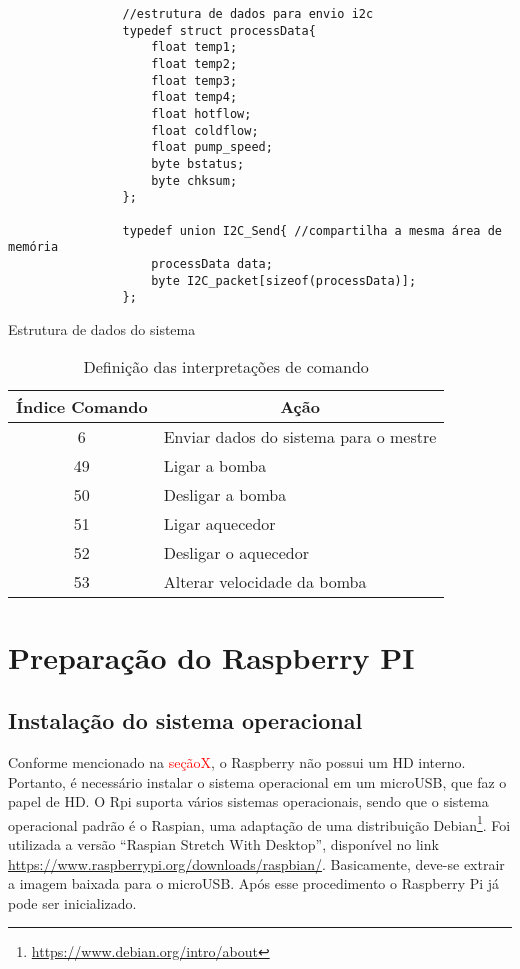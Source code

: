 			\begin{listing}
				\begin{verbatim}
				//estrutura de dados para envio i2c
				typedef struct processData{
					float temp1;
					float temp2;
					float temp3;
					float temp4;
					float hotflow;
					float coldflow;
					float pump_speed;
					byte bstatus;
					byte chksum;
				};
				
				typedef union I2C_Send{ //compartilha a mesma área de memória
					processData data;
					byte I2C_packet[sizeof(processData)];
				};				
				\end{verbatim}
				\caption{Estrutura de dados do sistema}
				\label{cod:dadosi2c}
			\end{listing}
		
		\begin{table}[!htb]
			\centering
			\caption{Definição das interpretações de comando}
			\label{tbl5}
			\def\arraystretch{1.3}
			\begin{tabular}{c p{11cm}}
				\hline
				\multicolumn{1}{c}{\textbf{Índice Comando}} & \multicolumn{1}{c}{\textbf{Ação}} \\ \hline
				
				6 & Enviar dados do sistema para o mestre \\
				49 & Ligar a bomba \\ %
				50 & Desligar a bomba \\ %
				51 & Ligar aquecedor \\ %
				52 & Desligar o aquecedor \\ %
				53 & Alterar velocidade da bomba \\ %
				\hline
			\end{tabular}
		\end{table}
		
	\section{Preparação do Raspberry PI}
		\subsection{Instalação do sistema operacional}
			Conforme mencionado na \textcolor{red}{seçãoX}, o Raspberry não possui um HD interno. Portanto, é necessário instalar o sistema operacional em um microUSB, que faz o papel de HD. O Rpi suporta vários sistemas operacionais, sendo que o sistema operacional padrão é o Raspian, uma adaptação de uma distribuição Debian\footnote{\url{https://www.debian.org/intro/about}}. Foi utilizada a versão ``Raspian Stretch With Desktop'', disponível no link \url{https://www.raspberrypi.org/downloads/raspbian/}. Basicamente, deve-se extrair a imagem baixada para o microUSB. Após esse procedimento o Raspberry Pi já pode ser inicializado.
		

